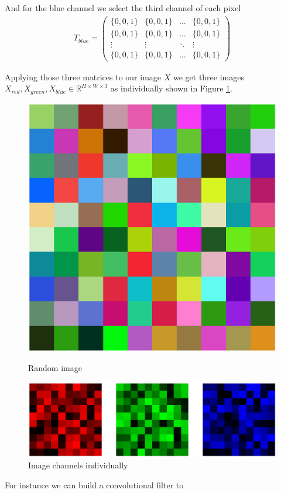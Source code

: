 And for the blue channel we select the third channel of each pixel
\begin{align}
  T_{blue} = \begin{pmatrix}
    \{0, 0, 1\}
    & \{0, 0, 1\}
    & \dots
    & \{0, 0, 1\}\\
    \{0, 0, 1\}
    & \{0, 0, 1\}
    & \dots
    & \{0, 0, 1\}\\
    \vdots & \vdots & \ddots & \vdots \\
    \{0, 0, 1\}
    & \{0, 0, 1\}
    & \dots
    & \{0, 0, 1\}
  \end{pmatrix}
\end{align}

Applying those three matrices to our image $X$ we get three images $X_{red}, X_{green}, X_{blue} \in \mathbb{R}^{H \times W \times 3}$ as individually shown in Figure \ref{fig:channels-individual}.
\begin{figure}
  \centering
\begin{minipage}[t]{.3\textwidth}
  \includegraphics[width=.95\textwidth]{images/FE_img_rng_image.eps}
  \caption{Random image}
  \label{fig:channels}
\end{minipage}
\begin{minipage}[t]{.6\textwidth}
  \includegraphics[width=.95\textwidth]{images/FE_img_channels.eps}
  \caption{Image channels individually}
  \label{fig:channels-individual}
\end{minipage}
\end{figure}

For instance we can build a convolutional filter to 

